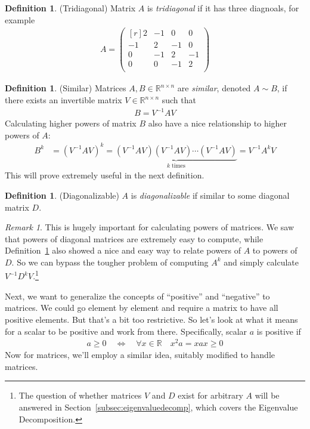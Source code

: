 \documentclass[12pt]{article}
\numberwithin{equation}{section} %
\theoremstyle{plain}
\theoremstyle{definition}
\newtheorem{defn}[thm]{Definition}
\theoremstyle{remark}
\newtheorem*{rmk}{Remark}
\newcommand{\R}{\mathbb{R}}
\newcommand{\Rnn}{\mathbb{R}^{n\times n}}
\begin{document}
\begin{defn}{(Tridiagonal)}
Matrix $A$ is \emph{tridiagonal} if it has three diagnoals, for example
\begin{align*}
  A =
  \begin{pmatrix}[r]
   2 & -1 &  0 &  0 \\
  -1 & 2 & -1 &  0 \\
   0 & -1 &  2 & -1 \\
   0 &  0 & -1 &  2 \\
  \end{pmatrix}
\end{align*}
\end{defn}

\begin{defn}{(Similar)}
\label{defn:similar}
Matrices $A,B \in \Rnn$ are \emph{similar}, denoted $A\sim B$, if there
exists an invertible matrix $V\in \Rnn$ such that
\begin{align*}
  B = V^{-1} A V
\end{align*}
Calculating higher powers of matrix $B$ also have a nice relationship to
higher powers of $A$:
\begin{align*}
  B^k &= \left(V^{-1} A V\right)^k
      = \underbrace{\left(V^{-1} A V\right)\left(V^{-1} A V\right)
      \cdots  \left(V^{-1} A V\right)}_{k \;\text{times}}
      = V^{-1} A^k V
\end{align*}
This will prove extremely useful in the next definition.
\end{defn}

\begin{defn}{(Diagonalizable)}
$A$ is \emph{diagonalizable} if similar to some diagonal matrix $D$.
\end{defn}
\begin{rmk}
This is hugely important for calculating powers of matrices. We saw that
powers of diagonal matrices are extremely easy to compute, while
Definition~\ref{defn:similar} also showed a nice and easy way to relate
powers of $A$ to powers of $D$. So we can bypass the tougher problem of
computing $A^k$ and simply calculate $V^{-1} D^k V$.\footnote{%
The question of whether matrices $V$ and $D$ exist for arbitrary $A$
will be answered in Section~\ref{subsec:eigenvaluedecomp}, which covers
the Eigenvalue Decomposition.
}
\end{rmk}

Next, we want to generalize the concepts of ``positive'' and
``negative'' to matrices. We could go element by element and require a
matrix to have all positive elements. But that's a bit too restrictive.
So let's look at what it means for a scalar to be positive and work from
there. Specifically, scalar $a$ is positive if
\begin{align*}
  a \geq 0
  \quad\Leftrightarrow\quad
  \forall x\in \R
  \quad
  x^2 a = x a x\geq 0
\end{align*}
Now for matrices, we'll employ a similar idea, suitably modified to
handle matrices.
\end{document}
